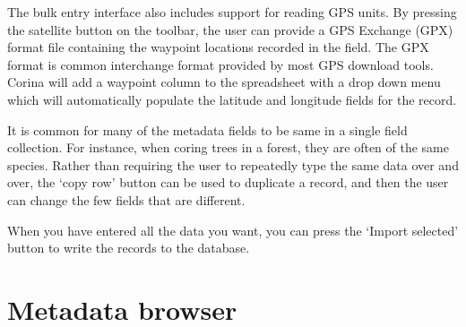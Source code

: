 The bulk entry interface also includes support for reading GPS units.  By pressing the satellite button on the toolbar, the user can provide a GPS Exchange (GPX) format file containing the waypoint locations recorded in the field.  The GPX format is common interchange format provided by most GPS download tools.  Corina will add a waypoint column to the spreadsheet with a drop down menu which will automatically populate the latitude and longitude fields for the record.


It is common for many of the metadata fields to be same in a single field collection.  For instance, when coring trees in a forest, they are often of the same species.  Rather than requiring the user to repeatedly type the same data over and over, the `copy row' button can be used to duplicate a record, and then the user can change the few fields that are different.

When you have entered all the data you want, you can press the `Import selected' button to write the records to the database.  



\section{Metadata browser}

